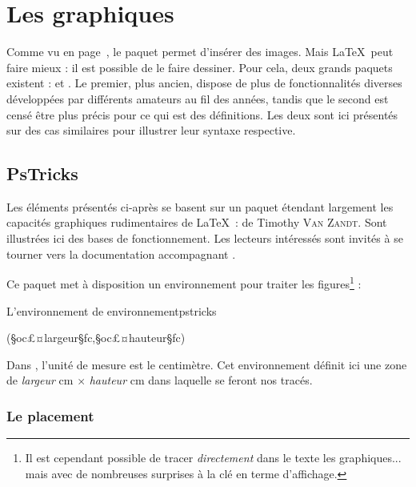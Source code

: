 
\chapter{Les graphiques}

Comme vu en page~\pageref{images}, le paquet  permet d'insérer des images. Mais \LaTeX\ peut faire mieux : il est possible de le faire dessiner. Pour cela, deux grands paquets existent :  et . Le premier, plus ancien, dispose de plus de fonctionnalités diverses développées par différents amateurs au fil des années, tandis que le second est censé être plus précis pour ce qui est des définitions. Les deux sont ici présentés sur des cas similaires pour illustrer leur syntaxe respective. 

\section{PsTricks} \label{pstricks} 

Les éléments présentés ci-après se basent sur un paquet étendant largement les capacités graphiques rudimentaires de \LaTeX\ :  de Timothy \textsc{Van Zandt}. Sont illustrées ici des bases de fonctionnement. Les lecteurs intéressés sont invités à se tourner vers la documentation accompagnant .

Ce paquet met à disposition un environnement pour traiter les figures\footnote{Il est cependant possible de tracer \emph{directement} dans le texte les graphiques... mais avec de nombreuses surprises à la clé en terme d'affichage.} : 

\begin{codesimple}{L'environnement de }{environnementpstricks}
\begin{pspicture}(§oc£¤largeur§fc,§oc£¤hauteur§fc) 
\end{pspicture}
\end{codesimple}


Dans , l'unité de mesure est le centimètre. Cet environnement définit ici une zone de \og \emph{largeur} cm $\times$ \emph{hauteur} cm \fg dans laquelle se feront nos tracés.


\subsection{Le placement}

